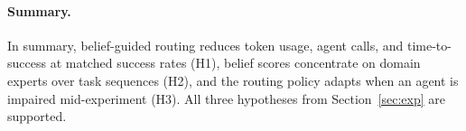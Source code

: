 \paragraph{Summary.}
In summary, belief-guided routing reduces token usage, agent calls, and time-to-success at matched success rates (H1), belief scores concentrate on domain experts over task sequences (H2), and the routing policy adapts when an agent is impaired mid-experiment (H3). All three hypotheses from Section~\ref{sec:exp} are supported.
